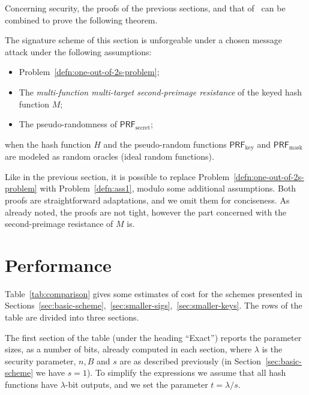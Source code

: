 \documentclass{llncs}
\newcommand{\PRF}{\mathsf{PRF}}
\newcommand{\PRFk}{\PRF_{\mathrm{key}}}
\newcommand{\PRFm}{\PRF_{\mathrm{mask}}}
\newcommand{\PRFs}{\PRF_{\mathrm{secret}}}
\begin{document}
Concerning security, the proofs of the previous sections, and that of~\cite[Appendix~B]{10.1007/978-3-662-49384-7_15} can be combined to prove the following theorem.

\begin{theorem}
  The signature scheme of this section is unforgeable under a chosen
  message attack under the following assumptions:
  \begin{itemize}
  \item Problem~\ref{defn:one-out-of-2s-problem};
  \item The \emph{multi-function multi-target second-preimage resistance} of
    the keyed hash function $M$;
  \item The pseudo-randomness of $\PRFs$;
  \end{itemize}
  when the hash function $H$ and the pseudo-random functions $\PRFk$
  and $\PRFm$ are modeled as random oracles (ideal random functions).
\end{theorem}

Like in the previous section, it is possible to replace Problem~\ref{defn:one-out-of-2s-problem} with Problem~\ref{defn:ass1}, modulo some additional assumptions.
Both proofs are straightforward adaptations, and we omit them for conciseness.
As already noted, the proofs are not tight, however the part concerned with the second-preimage resistance of $M$ is.


\section{Performance}


Table~\ref{tab:comparison} gives some estimates of cost for the schemes presented in Sections~\ref{sec:basic-scheme},~\ref{sec:smaller-sigs},~\ref{sec:smaller-keys}.
The rows of the table are divided into three sections.

The first section of the table (under the heading ``Exact'') reports the parameter sizes, as a number of bits, already computed in each section, where
$\lambda$ is the security parameter, $n,B$ and $s$ are as described previously (in Section~\ref{sec:basic-scheme} we have $s=1$).
To simplify the expressions we assume that all hash functions have $\lambda$-bit outputs, and we set the parameter $t=\lambda/s$.
\end{document}
